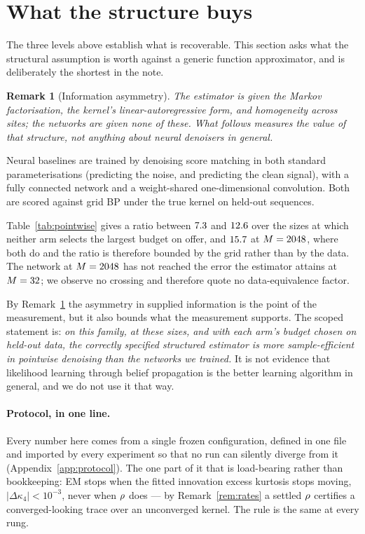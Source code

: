 \documentclass{article}
\newtheorem{remark}{Remark}
\begin{document}
\section{What the structure buys}
\label{sec:networks}

The three levels above establish what is recoverable. This section asks what the structural
assumption is worth against a generic function approximator, and is deliberately the shortest in
the note.

\begin{remark}[Information asymmetry]
\label{rem:asymmetry}
The estimator is given the Markov factorisation, the kernel's linear-autoregressive form, and
homogeneity across sites; the networks are given none of these. What follows measures the value of
that structure, not anything about neural denoisers in general.
\end{remark}

\noindent
Neural baselines are trained by denoising score matching in both standard parameterisations
(predicting the noise, and predicting the clean signal), with a fully connected network and a
weight-shared one-dimensional convolution. Both are scored against grid BP under the true kernel
on held-out sequences.



Table~\ref{tab:pointwise} gives a ratio between $7.3$ and $12.6$ over the
\nsizessub{} sizes at which neither arm selects the largest budget on offer, and $15.7$ at
$M=2048$, where both do and the ratio is therefore bounded by the grid rather than by the
data. The network at $M=2048$ has not reached the error the estimator attains at
$M=32$; we observe no crossing and therefore quote no data-equivalence factor.

By Remark~\ref{rem:asymmetry} the asymmetry in supplied information is the point of the
measurement, but it also bounds what the measurement supports. The scoped statement is: \emph{on
this family, at these sizes, and with each arm's budget chosen on held-out data, the correctly
specified structured estimator is more sample-efficient in pointwise denoising than the networks we
trained.} It is not evidence that likelihood learning through belief propagation is the better
learning algorithm in general, and we do not use it that way.



\noindent
\paragraph{Protocol, in one line.} Every number here comes from a single frozen configuration,
defined in one file and imported by every experiment so that no run can silently diverge from it
(Appendix~\ref{app:protocol}). The one part of it that is load-bearing rather than bookkeeping:
EM stops when the fitted innovation excess kurtosis stops moving, $|\Delta\kappa_4|<10^{-3}$, never
when $\rho$ does --- by Remark~\ref{rem:rates} a settled $\rho$ certifies a converged-looking
trace over an unconverged kernel. The rule is the same at every rung.
\end{document}
